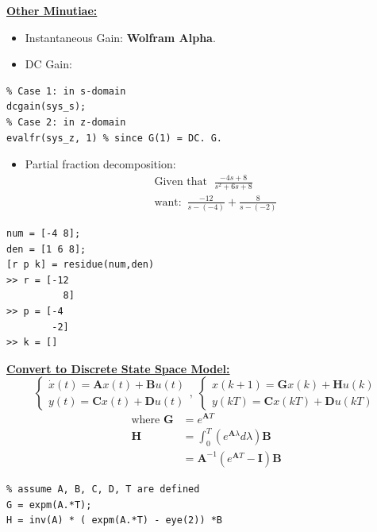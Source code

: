 \textbf{\underline{Other Minutiae:}}
\begin{itemize}
    \item Instantaneous Gain: \textbf{Wolfram Alpha}.
    \item DC Gain:
\end{itemize}
\begin{lstlisting}
% Case 1: in s-domain
dcgain(sys_s);
% Case 2: in z-domain
evalfr(sys_z, 1) % since G(1) = DC. G.
\end{lstlisting}

\begin{itemize}
    \item Partial fraction decomposition:
    \begin{align*}
        \text{Given that }\; \frac{-4s+8}{s^2+6s+8} \\
        \text{want: }\, \frac{-12}{s-(-4)} + \frac{8}{s-(-2)}
    \end{align*}
\end{itemize}
\begin{lstlisting}
num = [-4 8];
den = [1 6 8];
[r p k] = residue(num,den)
>> r = [-12 
          8]
>> p = [-4 
        -2]
>> k = []        
\end{lstlisting}

\textbf{\underline{Convert to Discrete State Space Model:}}
\begin{equation*}
    \begin{cases}
     \dot{x}(t) = \bm{A}x(t) + \bm{B}u(t) \\
     y(t) = \bm{C}x(t)+\bm{D} u(t)
    \end{cases}, \; \begin{cases}
     x(k+1) = \bm{G}x(k) + \bm{H}u(k) \\
     y(kT) = \bm{C}x(kT) + \bm{D}u(kT)
    \end{cases}
\end{equation*}
\begin{align*}
    \text{where } \bm{G} &= e^{\bm{A}T} \\
    \bm{H} &= \int_{0}^{T}\left(e^{\bm{A}\lambda} d\lambda\right) \bm{B} \\
    &= \bm{A}^{-1} (e^{\bm{A}T}- \bm{I})\bm{B}
\end{align*}
\begin{lstlisting}
% assume A, B, C, D, T are defined
G = expm(A.*T);
H = inv(A) * ( expm(A.*T) - eye(2)) *B
\end{lstlisting}

